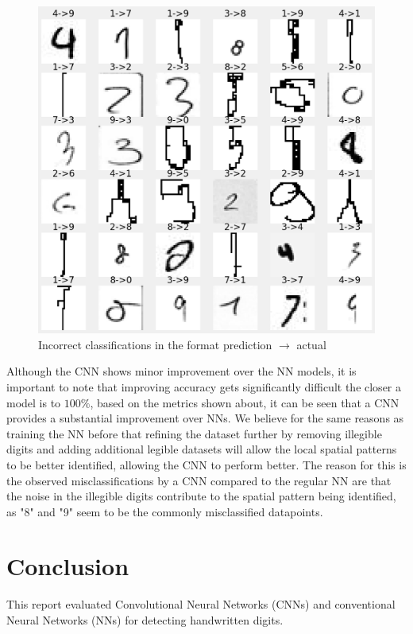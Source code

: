 \documentclass[a4paper,twoside,10pt]{article}
\begin{document}
\begin{figure}[H]
    \centering
    \includegraphics[scale=0.3]{Incorrect CNN}
    \caption{Incorrect classifications in the format prediction $\rightarrow$ actual}
    \label{fig:cnn_incorrect}
\end{figure}

Although the CNN shows minor improvement over the NN models, it is important to note that improving accuracy gets significantly difficult the closer a model is to $100\%$, based on the metrics shown about, it can be seen that a CNN provides a substantial improvement over NNs. 
We believe for the same reasons as training the NN before that refining the dataset further by removing illegible digits and adding additional legible datasets will allow the local spatial patterns to be better identified, allowing the CNN to perform better. The reason for this is the observed misclassifications by a CNN compared to the regular NN are that the noise in the illegible digits contribute to the spatial pattern being identified, as "8" and "9" seem to be the commonly misclassified datapoints.

\section{Conclusion}
This report evaluated Convolutional Neural Networks (CNNs) and conventional Neural Networks (NNs) for detecting handwritten digits. 
\end{document}
